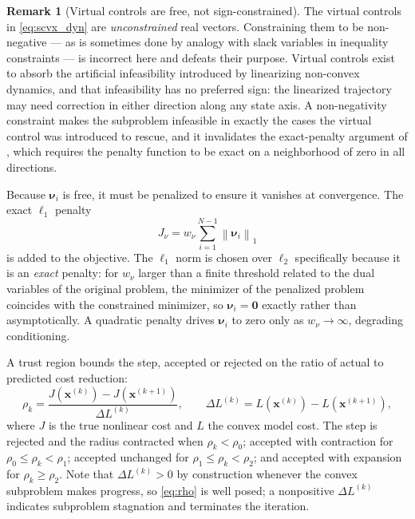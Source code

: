 \documentclass[11pt,a4paper]{article}
\theoremstyle{definition}
\newtheorem{remark}[theorem]{Remark}
\numberwithin{equation}{section}
\begin{document}
\begin{remark}[Virtual controls are free, not sign-constrained]
\label{rem:virtual}
The virtual controls in \cref{eq:scvx_dyn} are \emph{unconstrained} real vectors. Constraining them to be non-negative --- as is sometimes done by analogy with slack variables in inequality constraints --- is incorrect here and defeats their purpose. Virtual controls exist to absorb the artificial infeasibility introduced by linearizing non-convex dynamics, and that infeasibility has no preferred sign: the linearized trajectory may need correction in either direction along any state axis. A non-negativity constraint makes the subproblem infeasible in exactly the cases the virtual control was introduced to rescue, and it invalidates the exact-penalty argument of \cite{mao2016}, which requires the penalty function to be exact on a neighborhood of zero in all directions.
\end{remark}

Because $\bm{\nu}_i$ is free, it must be penalized to ensure it vanishes at convergence. The exact $\ell_1$ penalty
\begin{equation}
\label{eq:penalty}
J_\nu = w_\nu \sum_{i=1}^{N-1} \left\| \bm{\nu}_i \right\|_1
\end{equation}
is added to the objective. The $\ell_1$ norm is chosen over $\ell_2$ specifically because it is an \emph{exact} penalty: for $w_\nu$ larger than a finite threshold related to the dual variables of the original problem, the minimizer of the penalized problem coincides with the constrained minimizer, so $\bm{\nu}_i = \mathbf{0}$ exactly rather than asymptotically. A quadratic penalty drives $\bm{\nu}_i$ to zero only as $w_\nu \to \infty$, degrading conditioning.

A trust region bounds the step, accepted or rejected on the ratio of actual to predicted cost reduction:
\begin{equation}
\label{eq:rho}
\rho_k = \frac{J\!\left(\mathbf{x}^{(k)}\right) - J\!\left(\mathbf{x}^{(k+1)}\right)}{\Delta L^{(k)}},
\qquad
\Delta L^{(k)} = L\!\left(\mathbf{x}^{(k)}\right) - L\!\left(\mathbf{x}^{(k+1)}\right),
\end{equation}
where $J$ is the true nonlinear cost and $L$ the convex model cost. The step is rejected and the radius contracted when $\rho_k < \rho_0$; accepted with contraction for $\rho_0 \le \rho_k < \rho_1$; accepted unchanged for $\rho_1 \le \rho_k < \rho_2$; and accepted with expansion for $\rho_k \ge \rho_2$. Note that $\Delta L^{(k)} > 0$ by construction whenever the convex subproblem makes progress, so \cref{eq:rho} is well posed; a nonpositive $\Delta L^{(k)}$ indicates subproblem stagnation and terminates the iteration.
\end{document}
